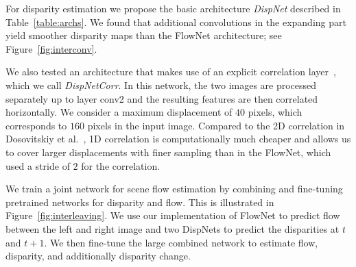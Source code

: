 \documentclass[10pt,twocolumn,letterpaper]{article}
\begin{document}
For disparity estimation we propose the basic architecture \emph{DispNet} described in Table~\ref{table:archs}. We found that additional convolutions in the expanding part yield smoother disparity maps than the FlowNet architecture; see Figure~\ref{fig:interconv}.

We also tested an architecture that makes use of an explicit correlation layer~\cite{FlowNet}, which we call \emph{DispNetCorr}.
In this network, the two images are processed separately up to layer conv2 and the resulting features are then correlated horizontally. We consider a maximum displacement of $40$ pixels, which corresponds to $160$ pixels in the input image. 
Compared to the 2D correlation in Dosovitskiy et al.~\cite{FlowNet}, 1D correlation is computationally much cheaper and allows us to cover larger displacements with finer sampling than in the FlowNet, which used a stride of $2$ for the correlation. 

We train a joint network for scene flow estimation by combining and fine-tuning pretrained networks for disparity and flow.
This is illustrated in Figure~\ref{fig:interleaving}. We use our implementation of FlowNet to predict flow between the left and right image and two DispNets to predict the disparities at $t$ and $t\!+\!1$. We then fine-tune the large combined network to estimate flow, disparity, and additionally disparity change. 
\end{document}
